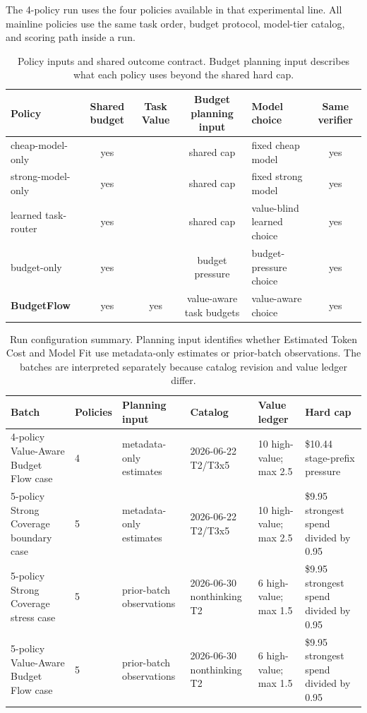 \documentclass[sigconf,review,anonymous]{acmart}
\newcommand{\method}{BudgetFlow\xspace}
\newcommand{\tokencost}{Estimated Token Cost\xspace}
\newcommand{\modelfit}{Model Fit\xspace}
\begin{document}
The 4-policy run uses the four policies available in that experimental line. All mainline policies use the same task order, budget protocol, model-tier catalog, and scoring path inside a run.

\begin{table}[t]
\centering
\small
\begin{tabular}{lccclc}
\toprule
Policy & Shared budget & \textbf{Task Value} & Budget planning input & Model choice & Same verifier \\
\midrule
cheap-model-only & yes &  & shared cap & fixed cheap model & yes \\
strong-model-only & yes &  & shared cap & fixed strong model & yes \\
learned task-router & yes &  & shared cap & value-blind learned choice & yes \\
budget-only & yes &  & budget pressure & budget-pressure choice & yes \\
\textbf{\method} & yes & yes & value-aware task budgets & value-aware choice & yes \\
\bottomrule
\end{tabular}
\caption{Policy inputs and shared outcome contract. Budget planning input describes what each policy uses beyond the shared hard cap.}
\label{tab:policies}
\end{table}

\begin{table}[t]
\centering
\scriptsize
\setlength{\tabcolsep}{3pt}
\begin{tabular}{@{}p{}p{}p{}p{}p{}p{}@{}}
\toprule
Batch & Policies & Planning input & Catalog & Value ledger & Hard cap \\
\midrule
4-policy Value-Aware Budget Flow case & 4 & metadata-only estimates & 2026-06-22 T2/T3x5 & 10 high-value; max 2.5 & \$10.44 stage-prefix pressure \\
5-policy Strong Coverage boundary case & 5 & metadata-only estimates & 2026-06-22 T2/T3x5 & 10 high-value; max 2.5 & \$9.95 strongest spend divided by 0.95 \\
5-policy Strong Coverage stress case & 5 & prior-batch observations & 2026-06-30 nonthinking T2 & 6 high-value; max 1.5 & \$9.95 strongest spend divided by 0.95 \\
5-policy Value-Aware Budget Flow case & 5 & prior-batch observations & 2026-06-30 nonthinking T2 & 6 high-value; max 1.5 & \$9.95 strongest spend divided by 0.95 \\
\bottomrule
\end{tabular}
\caption{Run configuration summary. Planning input identifies whether \tokencost and \modelfit use metadata-only estimates or prior-batch observations. The batches are interpreted separately because catalog revision and value ledger differ.}
\label{tab:run-config}
\end{table}
\end{document}
